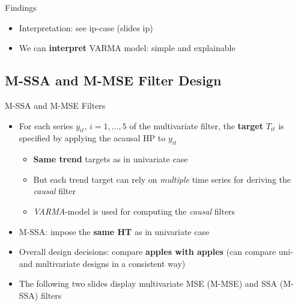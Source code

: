 \documentclass{beamer}
\begin{document}
\begin{frame} {Findings}
\begin{itemize}
\item Interpretation: see ip-case (slides ip)
\item We can \textbf{interpret} VARMA model: simple and explainable
\end{itemize}

\end{frame}




\subsection{M-SSA and M-MSE Filter Design}

\begin{frame} {M-SSA and M-MSE Filters}
\begin{itemize}
\item For each series $y_{it}$, $i=1,...,5$ of the multivariate filter, the \textbf{target} $T_{it}$ is specified by applying the acausal HP to $y_{it}$ 
\begin{itemize}
\item \textbf{Same trend} targets as in univariate case 
\item But each trend target can rely on \emph{multiple} time series for deriving the \emph{causal} filter
\item \emph{VARMA}-model is used for computing the \emph{causal} filters
\end{itemize}
\item M-SSA: impose the \textbf{same HT} as in univariate case
\item Overall design decisions: compare \textbf{apples with apples} (can compare uni- and multivariate designs in a consistent way)
\item The following two slides display multivariate MSE (M-MSE) and SSA (M-SSA) filters
\end{itemize}

\end{frame}
\end{document}
